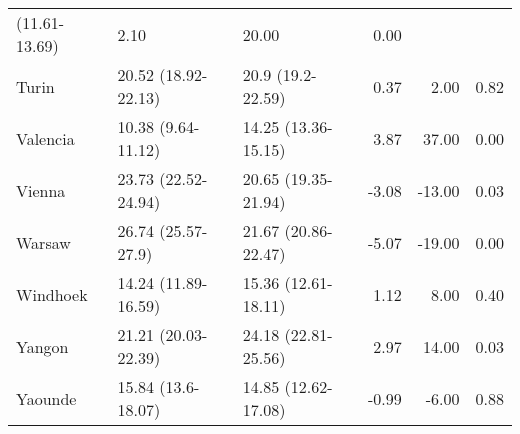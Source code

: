 \begin{longtable}{lllrrr}
 (11.61-13.69) & 2.10 & 20.00 & 0.00 \\ 
  Turin & 20.52
 (18.92-22.13) & 20.9
 (19.2-22.59) & 0.37 & 2.00 & 0.82 \\ 
  Valencia & 10.38
 (9.64-11.12) & 14.25
 (13.36-15.15) & 3.87 & 37.00 & 0.00 \\ 
  Vienna & 23.73
 (22.52-24.94) & 20.65
 (19.35-21.94) & -3.08 & -13.00 & 0.03 \\ 
  Warsaw & 26.74
 (25.57-27.9) & 21.67
 (20.86-22.47) & -5.07 & -19.00 & 0.00 \\ 
  Windhoek & 14.24
 (11.89-16.59) & 15.36
 (12.61-18.11) & 1.12 & 8.00 & 0.40 \\ 
  Yangon & 21.21
 (20.03-22.39) & 24.18
 (22.81-25.56) & 2.97 & 14.00 & 0.03 \\ 
  Yaounde & 15.84
 (13.6-18.07) & 14.85
 (12.62-17.08) & -0.99 & -6.00 & 0.88 \\ 
   \hline
\hline
\end{longtable}
